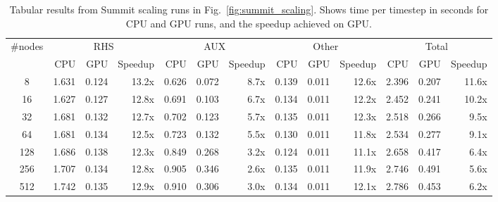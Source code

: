 \begin{table*}[htb]
  \centering
  \begin{tabular}{|c|rrr|rrr|rrr|rrr|}
  \hline
  $\#$nodes & \multicolumn{3}{|c|}{RHS} & \multicolumn{3}{|c|}{AUX}& \multicolumn{3}{|c|}{Other} & \multicolumn{3}{|c|}{Total} \\
  & CPU & GPU & Speedup & CPU & GPU & Speedup & CPU & GPU & Speedup & CPU & GPU & Speedup \\
  \hline
     8    & 1.631 & 0.124 & 13.2x    & 0.626 & 0.072 &  8.7x    & 0.139 & 0.011 & 12.6x    & 2.396 & 0.207 & 11.6x \\
    16    & 1.627 & 0.127 & 12.8x    & 0.691 & 0.103 &  6.7x    & 0.134 & 0.011 & 12.2x    & 2.452 & 0.241 & 10.2x \\
    32    & 1.681 & 0.132 & 12.7x    & 0.702 & 0.123 &  5.7x    & 0.135 & 0.011 & 12.3x    & 2.518 & 0.266 &  9.5x \\
    64    & 1.681 & 0.134 & 12.5x    & 0.723 & 0.132 &  5.5x    & 0.130 & 0.011 & 11.8x    & 2.534 & 0.277 &  9.1x \\
   128    & 1.686 & 0.138 & 12.3x    & 0.849 & 0.268 &  3.2x    & 0.124 & 0.011 & 11.1x    & 2.658 & 0.417 &  6.4x \\
   256    & 1.707 & 0.134 & 12.8x    & 0.905 & 0.346 &  2.6x    & 0.135 & 0.011 & 11.9x    & 2.746 & 0.491 &  5.6x \\
   512    & 1.742 & 0.135 & 12.9x    & 0.910 & 0.306 &  3.0x    & 0.134 & 0.011 & 12.1x    & 2.786 & 0.453 &  6.2x \\
  \hline
  \end{tabular}
  \caption{Tabular results from Summit scaling runs in Fig.~\ref{fig:summit_scaling}. Shows time per timestep in seconds for CPU and GPU runs, and the speedup achieved on GPU.}
  \label{tab:scaling}
\end{table*}
